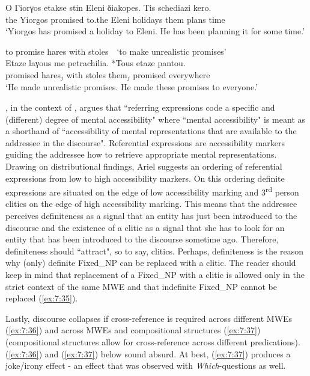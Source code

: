 \documentclass[output=paper]{langsci/langscibook}
\begin{document}
\ea%
\label{ex:7:34}
\gll O Γiorγos etakse stin Eleni δiakopes. Tis schediazi kero. \\
 the Yiorgos promised to.the Eleni holidays them plans time \\
\glt `Yiorgos has promised a holiday to Eleni. He has been planning it for some time.’
\z

\ea%
\label{ex:7:35}
to promise hares with stoles~~`to make unrealistic promises'\\
\gll 
 Etaze laγous me petrachilia. *Tous etaze pantou.\\
  promised  hares$_j$ with stoles them$_j$ promised everywhere\\
\glt `He made unrealistic promises. He made these promises to everyone.’
\z

\citet{ariel2001}, in the context of , argues that ``referring expressions code a specific and (different) degree of mental accessibility" where ``mental accessibility" is meant as a shorthand of ``accessibility of mental representations that are available to the addressee in the discourse". Referential expressions are accessibility markers guiding the addressee how to retrieve appropriate mental representations. Drawing on distributional findings, Ariel suggests an ordering of referential expressions from low to high accessibility markers. On this ordering definite expressions are situated on the edge of low accessibility marking and 3\textsuperscript{rd} person clitics on the edge of high accessibility marking. This means that the addressee perceives definiteness as a signal that an entity has just been introduced to the discourse and the existence of a clitic as a signal that she has to look for an entity that has been introduced to the discourse sometime ago. Therefore, definiteness should ``attract", so to say,  clitics. Perhaps, definiteness is the reason why (only) definite Fixed\_NP can be replaced with a clitic. The reader should keep in mind that replacement of a Fixed\_NP with a clitic is allowed only in the strict context of the same MWE and  that  indefinite Fixed\_NP cannot be replaced (\ref{ex:7:35}).

Lastly, discourse collapses if cross-reference is required across different MWEs (\ref{ex:7:36}) and across MWEs and compositional structures (\ref{ex:7:37}) (compositional structures allow for cross-reference across different predications). (\ref{ex:7:36}) and (\ref{ex:7:37}) below sound absurd. At best, (\ref{ex:7:37}) produces a joke/irony effect - an effect that was observed with \textit{Which}-questions as well. 
\end{document}
